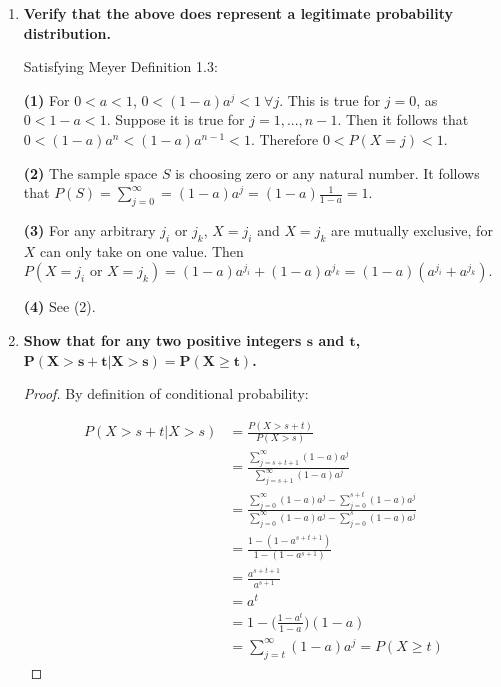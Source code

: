 \documentclass[10pt, oneside]{article}
\begin{document}
\begin{enumerate}[label=4.\arabic*]
\begin{enumerate}
	By definition, a probability $p$ must be bounded by $0 \leq p \leq 1$, and this condition fails for $a < 0$ and $a > 1$. Therefore, we must have $0 \leq a \leq 1$. Really, we should be stricter and require $0 < a < 1$ as $P(X = j)$ vanishes otherwise.
	
	\item  \begin{tcolorbox}[
	  colback=Cerulean!5!white,
	  colframe=Cerulean!75!black]
	\textbf{Verify that the above does represent a legitimate probability distribution.}
	\end{tcolorbox}
	
	Satisfying Meyer Definition 1.3:
	
	\textbf{(1)} For $0 < a < 1$, $0 < (1 - a)a^j < 1 \ \forall j$. This is true for $j = 0$, as $0 < 1-a < 1$. Suppose it is true for $j = 1, ..., n-1$. Then it follows that $0 < (1 - a)a^n < (1-a)a^{n-1} < 1$. Therefore $0 < P(X = j) < 1$.
	
	\textbf{(2)} The sample space $S$ is choosing zero or any natural number. It follows that $P(S) = \sum^\infty_{j = 0} = (1 - a)a^j = (1-a) \frac{1}{1-a} = 1$.
	
	\textbf{(3)} For any arbitrary $j_i$ or $j_k$, $X = j_i$ and $X = j_k$ are mutually exclusive, for $X$ can only take on one value. Then $P(X = j_i \text{ or } X = j_k) = (1 - a)a^{j_i} + (1 - a)a^{j_k} = (1 - a)(a^{j_i} + a^{j_k})$.
	
	\textbf{(4)} See (2).
	
	\item  \begin{tcolorbox}[
	  colback=Cerulean!5!white,
	  colframe=Cerulean!75!black]
	\textbf{Show that for any two positive integers $\bm{s}$ and $\bm{t}$, $\bm{P(X > s + t | X > s) = P(X \geq t)}$.}
	\end{tcolorbox}
	
	\begin{proof}
	By definition of conditional probability:
	
	\begin{align*}
	P(X > s + t | X > s) &= \frac{P(X > s + t)}{P(X > s)} \\
	&= \frac{\sum^\infty_{j = s + t + 1} (1-a)a^j}{\sum^\infty_{j = s + 1} (1-a)a^j} \\
	&= \frac{\sum^\infty_{j = 0} (1-a)a^j - \sum^{s+t}_{j = 0} (1-a)a^j}{\sum^\infty_{j = 0} (1-a)a^j - \sum^{s}_{j = 0} (1-a)a^j} \\
	&= \frac{1 - (1 - a^{s+t+1} ) }{1 - ( 1 - a^{s+1} ) } \\
	&= \frac{a^{s+t+1} }{a^{s+1} } \\
	&= a^t \\
	&= 1 - \Bigg( \frac{1 - a^t}{1-a} \Bigg) (1-a) \\
	&= \sum^\infty_{j = t} (1-a)a^j = P(X \geq t)
	\end{align*}
	\end{proof}
	\end{enumerate}
	

\end{enumerate}
\end{document}

